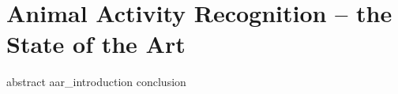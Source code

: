 \chapter{Animal Activity Recognition -- the State of the Art}
\label{chapter:state_of_the_art}
\glsresetall
{abstract}
\clearpage
{aar_introduction}
{conclusion}